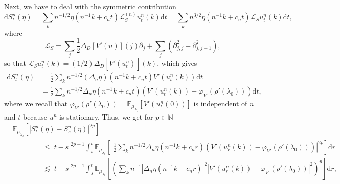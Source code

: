 \documentclass[11pt, a4paper]{article}
\newcommand{\mathd}{\mathrm{d}}
\newcommand{\tmstrong}[1]{\textbf{#1}}
\newcommand{\CL}{\mathcal{L}}
\newcommand{\1}{\mathbf{1}}
\begin{document}
Next, we have to deal with the symmetric contribution
\[ \mathd S^n_t (\eta) = \sum_k n^{- 1 / 2} \eta (n^{- 1} k + c_n t)
   \CL^{(n)}_S u^n_t(k) \mathd t = \sum_k n^{3 / 2} \eta (n^{- 1} k + c_n
   t) \CL_S u^n_t (k) \mathd t, \]
where
\[ \CL_S = \sum_j \frac{1}{2} \Delta_D [V' (u)] (j) \partial_j + \sum_j
   (\partial_{j, j}^2 - \partial_{j, j + 1}^2), \]
so that $\CL_S u^n_t (k) = (1 / 2) \Delta_D [V' (u^n_t)_{}] (k)$, which gives
\begin{align*}
 \mathd S^n_t (\eta)
 &= \frac{1}{2} \sum_k n^{- 1 / 2} (\Delta_n \eta) (n^{-
 1} k + c_n t) V' (u^n_t (k))_{} \mathd t \\
 &= \frac{1}{2} \sum_k n^{- 1 / 2} \Delta_n \eta (n^{- 1} k + c_n t) (V'
 (u^n_t (k)) - \varphi_{V'} (\rho' (\lambda_0))) \mathd t,
\end{align*}
where we recall that $\varphi_{V'} (\rho' (\lambda_0))
=\mathbb{E}_{{\mu}_{\lambda_0}} [V' (u^n_t (^{} 0))]$ is independent of
$n$ and $t$ because $u^n$ is stationary{\tmstrong{}}. Thus, we get for $p \in
\mathbb{N}$
\begin{align*}
   & \mathbb{E}_{{\mu}_{\lambda_0}} [| S^n_t (\eta) - S^n_s (\eta) |^{2 p}]
\\
   & \hspace{50pt} \leqslant | t - s |^{2 p - 1} \int_s^t \mathbb{E}_{{\mu}_{\lambda_0}}
   \left[ \left| \frac{1}{2} \sum_k n^{- 1 / 2} \Delta_n \eta (n^{- 1} k + c_n
   r) (V' (u^n_r (k)) - \varphi_{V'} (\rho' (\lambda_0))) \right|^{2 p}
   \right] \mathd r \\
   & \hspace{50pt} \lesssim | t - s |^{2 p - 1} \int_s^t \mathbb{E}_{{\mu}_{\lambda_0}}
   \left[ \left( \sum_k n^{- 1} | \Delta_n \eta (n^{- 1} k + c_n r) |^2 | V'
   (u^n_r (k)) - \varphi_{V'} (\rho' (\lambda_0)) |^2 \right)^p \right] \mathd
   r, 
\end{align*}
\end{document}
